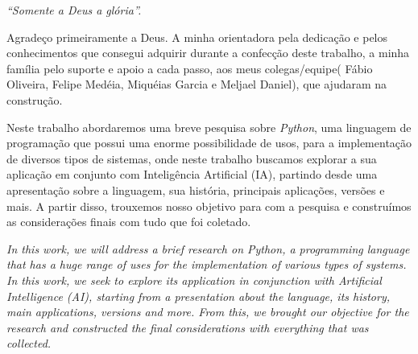 \begin{flushright}
{\it ``Somente a Deus a gl\'oria''.}
\end{flushright}


\pagebreak



\vspace{1.5cm}

Agradeço primeiramente a Deus. A minha orientadora pela dedicação e pelos conhecimentos que consegui adquirir durante a confecção deste trabalho, a minha família pelo suporte e apoio a cada passo, aos meus colegas/equipe( Fábio Oliveira, Felipe Medéia, Miquéias Garcia e Meljael Daniel), que ajudaram na construção.

\vspace{0.5cm}

\newpage


\vspace{1.5cm}

Neste trabalho abordaremos uma breve pesquisa sobre \textit{Python}, uma linguagem de programação que possui uma enorme possibilidade de usos, para a implementação de diversos tipos de sistemas, onde neste trabalho buscamos explorar a sua aplicação em conjunto com Inteligência Artificial (IA), partindo desde uma apresentação sobre a linguagem, sua história, principais aplicações, versões e mais. A partir disso, trouxemos nosso objetivo para com a pesquisa e construímos as considerações finais com tudo que foi coletado.

\vspace{0.5cm}


\pagebreak

\thispagestyle{empty}


\vspace{1.5cm}
\textit{In this work, we will address a brief research on Python, a programming language that has a huge range of uses for the implementation of various types of systems. In this work, we seek to explore its application in conjunction with Artificial Intelligence (AI), starting from a presentation about the language, its history, main applications, versions and more. From this, we brought our objective for the research and constructed the final considerations with everything that was collected.}

\vspace{0.5cm}


